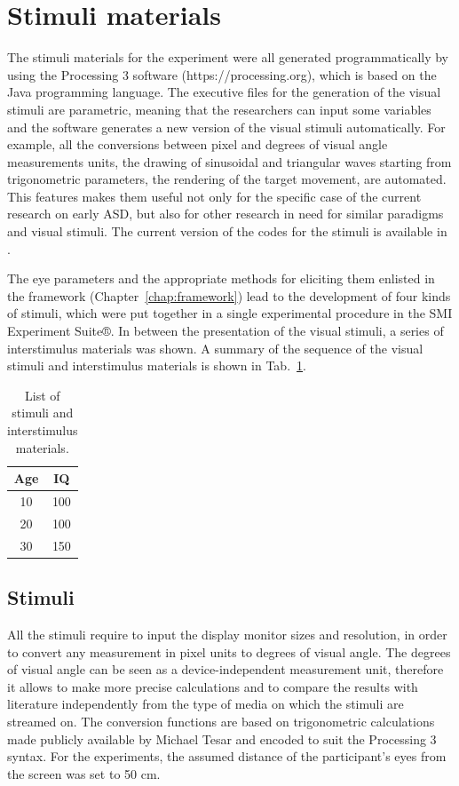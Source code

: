 \section{Stimuli materials}
\label{sec:expstimulimaterials}

The stimuli materials for the experiment were all generated programmatically by using the Processing 3 software (https://processing.org), which is based on the Java programming language. The executive files for the generation of the visual stimuli are parametric, meaning that the researchers can input some variables and the software generates a new version of the visual stimuli automatically. For example, all the conversions between pixel and degrees of visual angle measurements units, the drawing of sinusoidal and triangular waves starting from trigonometric parameters, the rendering of the target movement, are automated. This features makes them useful not only for the specific case of the current research on early ASD, but also for other research in need for similar paradigms and visual stimuli. The current version of the codes for the stimuli is available in .

The eye parameters and the appropriate methods for eliciting them enlisted in the framework (Chapter~\ref{chap:framework}) lead to the development of four kinds of stimuli, which were put together in a single experimental procedure in the SMI Experiment Suite®. In between the presentation of the visual stimuli, a series of interstimulus materials was shown. A summary of the sequence of the visual stimuli and interstimulus materials is shown in Tab.~\ref{tab:stimulisummary}.

\begin{table}[h]
  \centering
  \begin{tabular}{c|c}
    Age  & IQ  \\ 
    \hline
    10   & 100 \\
    20   & 100 \\
    30   & 150
  \end{tabular}
  \caption{List of stimuli and interstimulus materials.}
  \label{tab:stimulisummary}
\end{table}

\subsection{Stimuli}
\label{sec:expstimuli}

All the stimuli require to input the display monitor sizes and resolution, in order to convert any measurement in pixel units to degrees of visual angle. The degrees of visual angle can be seen as a device-independent measurement unit, therefore it allows to make more precise calculations and to compare the results with literature independently from the type of media on which the stimuli are streamed on. The conversion functions are based on trigonometric calculations made publicly available by Michael Tesar and encoded to suit the Processing 3 syntax. For the experiments, the assumed distance of the participant’s eyes from the screen was set to 50 cm.

